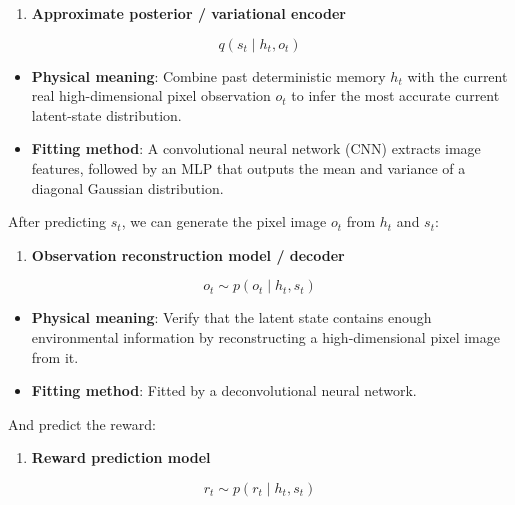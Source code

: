 \begin{enumerate}
\def\labelenumi{\arabic{enumi}.}
\setcounter{enumi}{2}
\tightlist
\item
  \textbf{Approximate posterior / variational encoder}
\end{enumerate}

\[
q(s_t \mid h_t, o_t)
\]

\begin{itemize}
\tightlist
\item
  \textbf{Physical meaning}: Combine past deterministic memory \(h_t\) with the current real high-dimensional pixel observation \(o_t\) to infer the most accurate current latent-state distribution.
\item
  \textbf{Fitting method}: A convolutional neural network (CNN) extracts image features, followed by an MLP that outputs the mean and variance of a diagonal Gaussian distribution.
\end{itemize}

After predicting \(s_t\), we can generate the pixel image \(o_t\) from \(h_t\) and \(s_t\):

\begin{enumerate}
\def\labelenumi{\arabic{enumi}.}
\setcounter{enumi}{3}
\tightlist
\item
  \textbf{Observation reconstruction model / decoder}
\end{enumerate}

\[
o_t \sim p(o_t \mid h_t, s_t)
\]

\begin{itemize}
\tightlist
\item
  \textbf{Physical meaning}: Verify that the latent state contains enough environmental information by reconstructing a high-dimensional pixel image from it.
\item
  \textbf{Fitting method}: Fitted by a deconvolutional neural network.
\end{itemize}

And predict the reward:

\begin{enumerate}
\def\labelenumi{\arabic{enumi}.}
\setcounter{enumi}{4}
\tightlist
\item
  \textbf{Reward prediction model}
\end{enumerate}

\[
r_t \sim p(r_t \mid h_t, s_t)
\]

